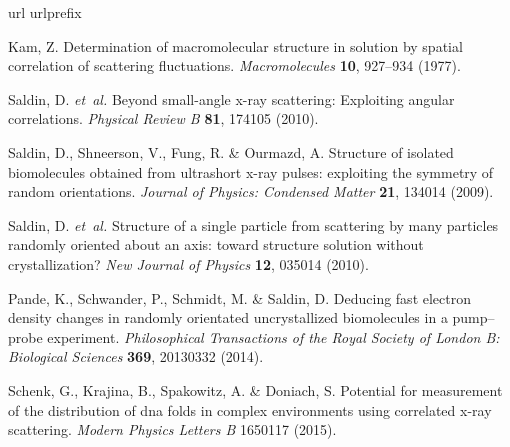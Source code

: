 \documentclass [12pt,fleqn]{article}
\begin{document}
\begin{thebibliography}{10}
\expandafter\ifx\csname url\endcsname\relax
  \def\url#1{\texttt{#1}}\fi
\expandafter\ifx\csname urlprefix\endcsname\relax\def\urlprefix{URL }\fi
\providecommand{\bibinfo}[2]{#2}
\providecommand{\eprint}[2][]{\url{#2}}

\bibinfo{author}{Kam, Z.}
\newblock \bibinfo{title}{Determination of macromolecular structure in solution
  by spatial correlation of scattering fluctuations}.
\newblock \emph{\bibinfo{journal}{Macromolecules}}
  \textbf{\bibinfo{volume}{10}}, \bibinfo{pages}{927--934}
  (\bibinfo{year}{1977}).

\bibinfo{author}{Saldin, D.} \emph{et~al.}
\newblock \bibinfo{title}{Beyond small-angle x-ray scattering: Exploiting
  angular correlations}.
\newblock \emph{\bibinfo{journal}{Physical Review B}}
  \textbf{\bibinfo{volume}{81}}, \bibinfo{pages}{174105}
  (\bibinfo{year}{2010}).

\bibinfo{author}{Saldin, D.}, \bibinfo{author}{Shneerson, V.},
  \bibinfo{author}{Fung, R.} \& \bibinfo{author}{Ourmazd, A.}
\newblock \bibinfo{title}{Structure of isolated biomolecules obtained from
  ultrashort x-ray pulses: exploiting the symmetry of random orientations}.
\newblock \emph{\bibinfo{journal}{Journal of Physics: Condensed Matter}}
  \textbf{\bibinfo{volume}{21}}, \bibinfo{pages}{134014}
  (\bibinfo{year}{2009}).

\bibinfo{author}{Saldin, D.} \emph{et~al.}
\newblock \bibinfo{title}{Structure of a single particle from scattering by
  many particles randomly oriented about an axis: toward structure solution
  without crystallization?}
\newblock \emph{\bibinfo{journal}{New Journal of Physics}}
  \textbf{\bibinfo{volume}{12}}, \bibinfo{pages}{035014}
  (\bibinfo{year}{2010}).

\bibinfo{author}{Pande, K.}, \bibinfo{author}{Schwander, P.},
  \bibinfo{author}{Schmidt, M.} \& \bibinfo{author}{Saldin, D.}
\newblock \bibinfo{title}{Deducing fast electron density changes in randomly
  orientated uncrystallized biomolecules in a pump--probe experiment}.
\newblock \emph{\bibinfo{journal}{Philosophical Transactions of the Royal
  Society of London B: Biological Sciences}} \textbf{\bibinfo{volume}{369}},
  \bibinfo{pages}{20130332} (\bibinfo{year}{2014}).

\bibinfo{author}{Schenk, G.}, \bibinfo{author}{Krajina, B.},
  \bibinfo{author}{Spakowitz, A.} \& \bibinfo{author}{Doniach, S.}
\newblock \bibinfo{title}{Potential for measurement of the distribution of dna
  folds in complex environments using correlated x-ray scattering}.
\newblock \emph{\bibinfo{journal}{Modern Physics Letters B}}
  \bibinfo{pages}{1650117} (\bibinfo{year}{2015}).


\end{thebibliography}
\end{document}
